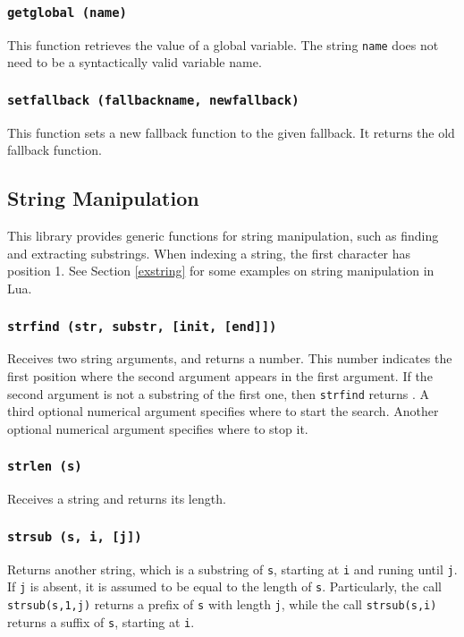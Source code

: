\subsubsection*{{\tt getglobal (name)}}
This function retrieves the value of a global variable.
The string \verb'name' does not need to be a syntactically valid variable name.

\subsubsection*{{\tt setfallback (fallbackname, newfallback)}}
This function sets a new fallback function to the given fallback.
It returns the old fallback function.

\subsection{String Manipulation}
This library provides generic functions for string manipulation,
such as finding and extracting substrings.
When indexing a string, the first character has position 1.
See Section \ref{exstring} for some examples on string manipulation
in Lua.

\subsubsection*{{\tt strfind (str, substr, [init, [end]])}}
Receives two string arguments,
and returns a number.
This number indicates the first position where the second argument appears
in the first argument.
If the second argument is not a substring of the first one,
then \verb'strfind' returns \nil.
A third optional numerical argument specifies where to start the search.
Another optional numerical argument specifies where to stop it.

\subsubsection*{{\tt strlen (s)}}
Receives a string and returns its length.

\subsubsection*{{\tt strsub (s, i, [j])}}
Returns another string, which is a substring of \verb's',
starting at \verb'i'  and runing until \verb'j'.
If \verb'j' is absent,
it is assumed to be equal to the length of \verb's'.
Particularly, the call \verb'strsub(s,1,j)' returns a prefix of \verb's'
with length \verb'j',
while the call \verb'strsub(s,i)' returns a suffix of \verb's',
starting at \verb'i'.

